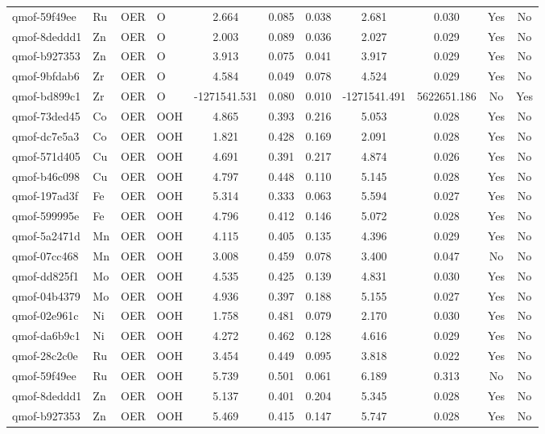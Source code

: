 {\begin{longtable}{llllccccccc}
qmof-59f49ee & Ru & OER & O & 2.664 & 0.085 & 0.038 & 2.681 & 0.030 & Yes & No \\
qmof-8deddd1 & Zn & OER & O & 2.003 & 0.089 & 0.036 & 2.027 & 0.029 & Yes & No \\
qmof-b927353 & Zn & OER & O & 3.913 & 0.075 & 0.041 & 3.917 & 0.029 & Yes & No \\
qmof-9bfdab6 & Zr & OER & O & 4.584 & 0.049 & 0.078 & 4.524 & 0.029 & Yes & No \\
qmof-bd899c1 & Zr & OER & O & -1271541.531 & 0.080 & 0.010 & -1271541.491 & 5622651.186 & No & Yes \\
qmof-73ded45 & Co & OER & OOH & 4.865 & 0.393 & 0.216 & 5.053 & 0.028 & Yes & No \\
qmof-dc7e5a3 & Co & OER & OOH & 1.821 & 0.428 & 0.169 & 2.091 & 0.028 & Yes & No \\
qmof-571d405 & Cu & OER & OOH & 4.691 & 0.391 & 0.217 & 4.874 & 0.026 & Yes & No \\
qmof-b46c098 & Cu & OER & OOH & 4.797 & 0.448 & 0.110 & 5.145 & 0.028 & Yes & No \\
qmof-197ad3f & Fe & OER & OOH & 5.314 & 0.333 & 0.063 & 5.594 & 0.027 & Yes & No \\
qmof-599995e & Fe & OER & OOH & 4.796 & 0.412 & 0.146 & 5.072 & 0.028 & Yes & No \\
qmof-5a2471d & Mn & OER & OOH & 4.115 & 0.405 & 0.135 & 4.396 & 0.029 & Yes & No \\
qmof-07cc468 & Mn & OER & OOH & 3.008 & 0.459 & 0.078 & 3.400 & 0.047 & No & No \\
qmof-dd825f1 & Mo & OER & OOH & 4.535 & 0.425 & 0.139 & 4.831 & 0.030 & Yes & No \\
qmof-04b4379 & Mo & OER & OOH & 4.936 & 0.397 & 0.188 & 5.155 & 0.027 & Yes & No \\
qmof-02e961c & Ni & OER & OOH & 1.758 & 0.481 & 0.079 & 2.170 & 0.030 & Yes & No \\
qmof-da6b9c1 & Ni & OER & OOH & 4.272 & 0.462 & 0.128 & 4.616 & 0.029 & Yes & No \\
qmof-28c2c0e & Ru & OER & OOH & 3.454 & 0.449 & 0.095 & 3.818 & 0.022 & Yes & No \\
qmof-59f49ee & Ru & OER & OOH & 5.739 & 0.501 & 0.061 & 6.189 & 0.313 & No & No \\
qmof-8deddd1 & Zn & OER & OOH & 5.137 & 0.401 & 0.204 & 5.345 & 0.028 & Yes & No \\
qmof-b927353 & Zn & OER & OOH & 5.469 & 0.415 & 0.147 & 5.747 & 0.028 & Yes & No \\

\end{longtable}}
